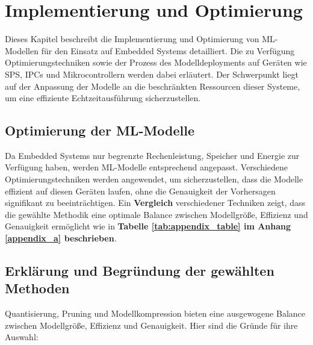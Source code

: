 \chapter{Implementierung und Optimierung}
\label{chap:implementierung_optimierung}

Dieses Kapitel beschreibt die Implementierung und Optimierung von ML-Modellen für den Einsatz auf Embedded Systems detailliert. 
Die zu Verfügung Optimierungstechniken sowie der Prozess des Modelldeployments auf Geräten wie SPS, IPCs und Mikrocontrollern werden dabei erläutert. 
Der Schwerpunkt liegt auf der Anpassung der Modelle an die beschränkten Ressourcen dieser Systeme, um eine effiziente Echtzeitausführung sicherzustellen.

\section{Optimierung der ML-Modelle}
Da Embedded Systems nur begrenzte Rechenleistung, Speicher und Energie zur Verfügung haben, werden ML-Modelle entsprechend angepasst. 
Verschiedene Optimierungstechniken werden angewendet, um sicherzustellen, dass die Modelle effizient auf diesen Geräten laufen, 
ohne die Genauigkeit der Vorhersagen signifikant zu beeinträchtigen. Ein \textbf{Vergleich} verschiedener Techniken zeigt, 
dass die gewählte Methodik eine optimale Balance zwischen Modellgröße, Effizienz und Genauigkeit ermöglicht wie in \textbf{Tabelle \ref{tab:appendix_table} im Anhang \ref{appendix_a} beschrieben}.


    \section*{Erklärung und Begründung der gewählten Methoden}
    
    Quantisierung, Pruning und Modellkompression bieten eine ausgewogene Balance zwischen Modellgröße, Effizienz und Genauigkeit. Hier sind die Gründe für ihre Auswahl:
    
